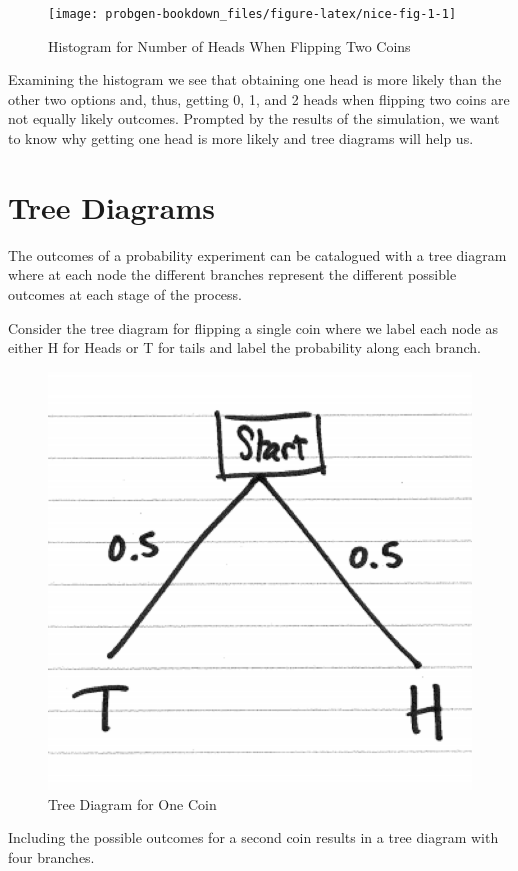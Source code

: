 \documentclass[]{book}
\theoremstyle{definition}
\theoremstyle{definition}
\theoremstyle{definition}
\theoremstyle{remark}
\begin{document}
\begin{figure}

{\centering \texttt{[image: probgen-bookdown\_files/figure-latex/nice-fig-1-1]} 

}

\caption{Histogram for Number of Heads When Flipping Two Coins}\label{fig:nice-fig-1}
\end{figure}

Examining the histogram we see that obtaining one head is more likely
than the other two options and, thus, getting 0, 1, and 2 heads when
flipping two coins are not equally likely outcomes. Prompted by the
results of the simulation, we want to know why getting one head is more
likely and tree diagrams will help us.

\section{Tree Diagrams}\label{tree_diagrams}

The outcomes of a probability experiment can be catalogued with a tree
diagram where at each node the different branches represent the
different possible outcomes at each stage of the process.

Consider the tree diagram for flipping a single coin where we label each
node as either H for Heads or T for tails and label the probability
along each branch.

\begin{figure}

{\centering \includegraphics[width=0.3\linewidth]{01-basics-figures/tree_one_coin} 

}

\caption{Tree Diagram for One Coin}\label{fig:nice-fig-2}
\end{figure}

Including the possible outcomes for a second coin results in a tree
diagram with four branches.
\end{document}
